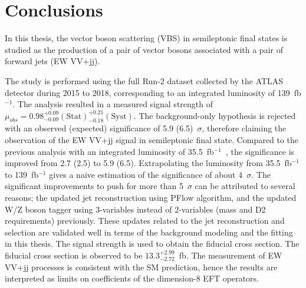 \chapter{Conclusions}
\label{chap:conclusions}

In this thesis, the vector boson scattering (VBS) in semileptonic final states is studied as the production of a pair of vector bosons associated with a pair of forward jets (EW VV+jj). 

The study is performed using the full Run-2 dataset collected by the ATLAS detector during 2015 to 2018, corresponding to an integrated luminosity of 139~fb$^{-1}$.
The analysis resulted in a measured signal strength of $\mu_{obs} = 0.98^{+ 0.09}_{- 0.09}(\mathrm{Stat})^{+ 0.21}_{- 0.18}(\mathrm{Syst})$.
The background-only hypothesis is rejected with an observed (expected) significance of 5.9 (6.5)~$\sigma$, therefore claiming the observation of the EW VV+jj signal in semileptonic final state. 
Compared to the previous analysis with an integrated luminosity of 35.5~fb$^{-1}$~\cite{STDM-2017-20}, the significance is improved from 2.7 (2.5) to 5.9 (6.5).
Extrapolating the luminosity from 35.5~fb$^{-1}$ to 139~fb$^{-1}$ gives a naive estimation of the significance of about 4~$\sigma$.
The significant improvements to push for more than 5~$\sigma$ can be attributed to several reasons; the updated jet reconstruction using PFlow algorithm, and the updated W/Z boson tagger using 3-variables instead of 2-variables (mass and D2 requirements) previously. 
These updates related to the jet reconstruction and selection are validated well in terms of the background modeling and the fitting in this thesis.
The signal strength is used to obtain the fiducial cross section. The fiducial cross section is observed to be $13.3^{+2.99}_{-2.72}$~fb.
The measurement of EW VV+jj processes is consistent with the SM prediction, hence the results are interpreted as limits on coefficients of the dimension-8 EFT operators.

